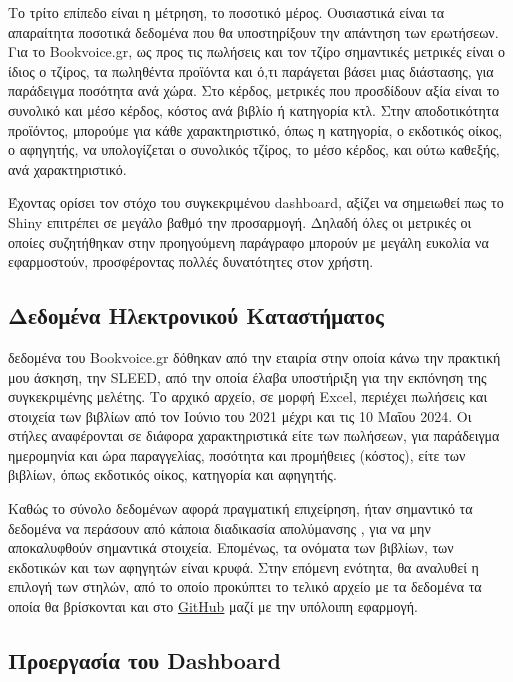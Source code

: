 \documentclass{article}
\begin{document}
Το τρίτο επίπεδο είναι η μέτρηση, το ποσοτικό μέρος. Ουσιαστικά είναι τα απαραίτητα ποσοτικά δεδομένα που θα υποστηρίξουν την απάντηση των ερωτήσεων. Για το Bookvoice.gr, ως προς τις πωλήσεις και τον τζίρο σημαντικές μετρικές είναι ο ίδιος ο τζίρος, τα πωληθέντα προϊόντα και ό,τι παράγεται βάσει μιας διάστασης, για παράδειγμα ποσότητα ανά χώρα. Στο κέρδος, μετρικές που προσδίδουν αξία είναι το συνολικό και μέσο κέρδος, κόστος ανά βιβλίο ή κατηγορία κτλ. Στην αποδοτικότητα προϊόντος, μπορούμε για κάθε χαρακτηριστικό, όπως η κατηγορία, ο εκδοτικός οίκος, ο αφηγητής, να υπολογίζεται ο συνολικός τζίρος, το μέσο κέρδος, και ούτω καθεξής, ανά χαρακτηριστικό.

Έχοντας ορίσει τον στόχο του συγκεκριμένου dashboard, αξίζει να σημειωθεί πως το Shiny επιτρέπει σε μεγάλο βαθμό την προσαρμογή. Δηλαδή όλες οι μετρικές οι οποίες συζητήθηκαν στην προηγούμενη παράγραφο μπορούν με μεγάλη ευκολία να εφαρμοστούν, προσφέροντας πολλές δυνατότητες στον χρήστη. 

\subsection{Δεδομένα Ηλεκτρονικού Καταστήματος}

 δεδομένα του Bookvoice.gr δόθηκαν από την εταιρία στην οποία κάνω την πρακτική μου άσκηση, την SLEED, από την οποία έλαβα υποστήριξη για την εκπόνηση της συγκεκριμένης μελέτης. Το αρχικό αρχείο, σε μορφή Excel, περιέχει πωλήσεις και στοιχεία των βιβλίων από τον Ιούνιο του 2021 μέχρι και τις 10 Μαΐου 2024. Οι στήλες αναφέρονται σε διάφορα χαρακτηριστικά είτε των πωλήσεων, για παράδειγμα ημερομηνία και ώρα παραγγελίας, ποσότητα και προμήθειες (κόστος), είτε των βιβλίων, όπως εκδοτικός οίκος, κατηγορία και αφηγητής.

Καθώς το σύνολο δεδομένων αφορά πραγματική επιχείρηση, ήταν σημαντικό τα δεδομένα να περάσουν από κάποια διαδικασία απολύμανσης \cite{atallah1999disclosure}, για να μην αποκαλυφθούν σημαντικά στοιχεία. Επομένως, τα ονόματα των βιβλίων, των εκδοτικών και των αφηγητών είναι κρυφά. Στην επόμενη ενότητα, θα αναλυθεί η επιλογή των στηλών, από το οποίο προκύπτει το τελικό αρχείο με τα δεδομένα τα οποία θα βρίσκονται και στο \href{https://github.com/kostas-rigan/r-shiny-dashboard-app}{GitHub} μαζί με την υπόλοιπη εφαρμογή.

\subsection{Προεργασία του Dashboard}
\end{document}
